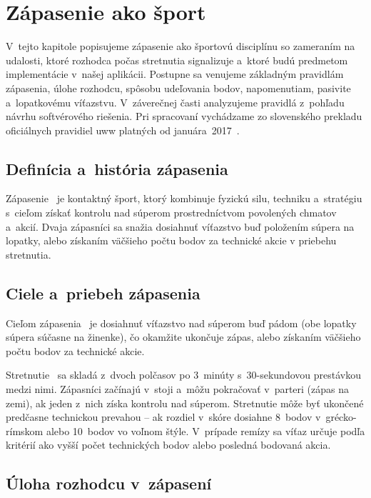 \section{Zápasenie ako šport}
\label{chapter:zapasenie}

V~tejto kapitole popisujeme zápasenie ako športovú
disciplínu so zameraním na udalosti, ktoré rozhodca
počas stretnutia signalizuje a~ktoré budú predmetom
implementácie v~našej aplikácii. Postupne sa
venujeme základným pravidlám zápasenia, úlohe rozhodcu,
spôsobu udeľovania bodov, napomenutiam, pasivite
a~lopatkovému víťazstvu. V~záverečnej časti
analyzujeme pravidlá z~pohľadu návrhu softvérového
riešenia. Pri spracovaní vychádzame zo slovenského
prekladu oficiálnych pravidiel \Gls{uww} platných
od januára~2017~\cite{zapasenie_pravidla}.

\subsection{Definícia a~história zápasenia}

Zápasenie~\cite{zapasenie_pravidla} je kontaktný šport,
ktorý kombinuje fyzickú silu, techniku a~stratégiu
s~cieľom získať kontrolu nad súperom prostredníctvom
povolených chmatov a~akcií. Dvaja zápasníci sa snažia
dosiahnuť víťazstvo buď položením súpera na lopatky,
alebo získaním väčšieho počtu bodov za technické akcie
v priebehu stretnutia.

\subsection{Ciele a~priebeh zápasenia}

Cieľom zápasenia~\cite{zapasenie_pravidla} je dosiahnuť
víťazstvo nad súperom buď pádom (obe lopatky súpera
súčasne na žinenke), čo okamžite ukončuje zápas, alebo
získaním väčšieho počtu bodov za technické akcie.

Stretnutie~\cite{zapasenie_pravidla} sa skladá z~dvoch
polčasov po 3~minúty s~30-sekundovou prestávkou medzi
nimi. Zápasníci začínajú v~stoji a~môžu pokračovať
v~parteri (zápas na zemi), ak jeden z~nich získa kontrolu
nad súperom. Stretnutie môže byť ukončené predčasne technickou
prevahou -- ak rozdiel v~skóre dosiahne 8~bodov v~grécko-rímskom
alebo 10~bodov vo voľnom štýle. V~prípade remízy sa víťaz
určuje podľa kritérií ako vyšší počet technických bodov
alebo posledná bodovaná akcia.

\subsection{Úloha rozhodcu v~zápasení}

